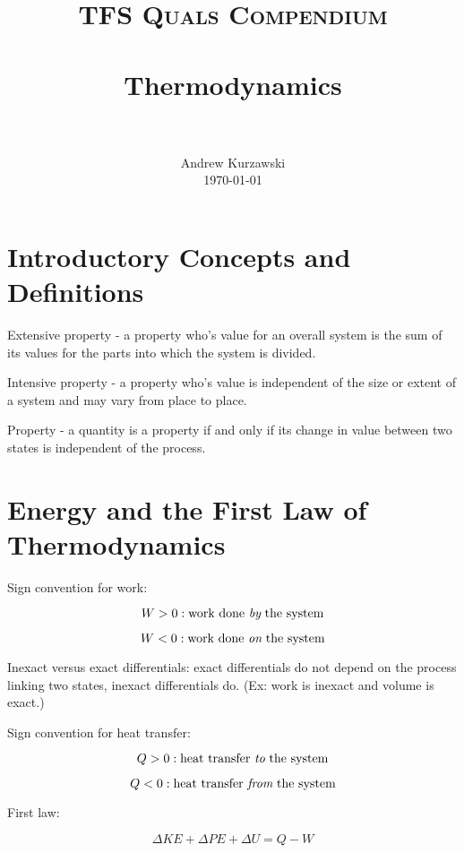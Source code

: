\documentclass[paper=letter, fontsize=11pt]{scrartcl}
\title{
        \usefont{OT1}{bch}{b}{n}
        \normalfont \normalsize \textsc{TFS Quals Compendium} \\ [25pt]
        \horrule{0.5pt} \\[0.4cm]
        \huge Thermodynamics \\
        \horrule{2pt} \\[0.5cm]
}
\author{
        \normalfont                                 \normalsize
        Andrew Kurzawski\\[-3pt]      \normalsize
        \today
}
\date{}
\numberwithin{equation}{section}        %
\numberwithin{figure}{section}          %
\numberwithin{table}{section}               %
\begin{document}
\maketitle

\section{Introductory Concepts and Definitions}
    
Extensive property - a property who's value for an overall system is the sum of its values for the parts into which the system is divided.

Intensive property - a property who's value is independent of the size or extent of a system and may vary from place to place.

Property - a quantity is a property if and only if its change in value between two states is independent of the process.


\section{Energy and the First Law of Thermodynamics}

Sign convention for work:

\begin{equation}
W > 0:\text{work done {\it by} the system}
\end{equation}

\begin{equation}
W < 0:\text{work done {\it on} the system}
\end{equation}

Inexact versus exact differentials: exact differentials do not depend on the process linking two states, inexact differentials do. (Ex: work is inexact and volume is exact.)

Sign convention for heat transfer:

\begin{equation}
Q > 0:\text{heat transfer {\it to} the system}
\end{equation}

\begin{equation}
Q < 0:\text{heat transfer {\it from} the system}
\end{equation}

First law:

\begin{equation}
\Delta KE + \Delta PE + \Delta U = Q - W
\end{equation}
\end{document}
